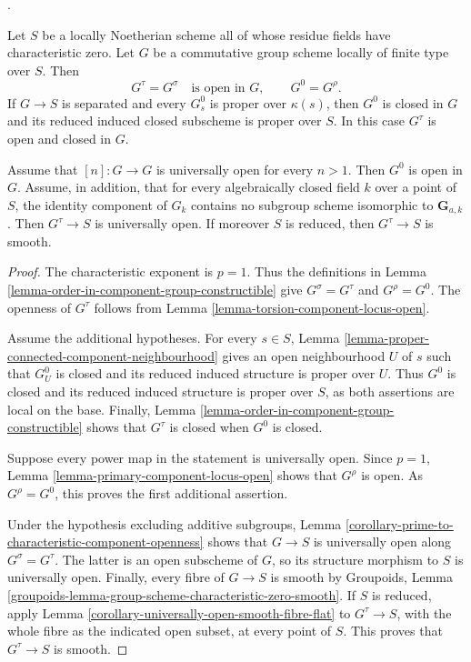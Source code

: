 \begin{lemma}
\label{lemma-characteristic-zero-component-loci}
\begin{reference}
\cite[Expos\'e 236, Corollary 1.10, p. 230]{FGA}.
\end{reference}
Let $S$ be a locally Noetherian scheme all of whose residue fields have
characteristic zero. Let $G$ be a commutative group scheme locally of finite
type over $S$. Then
$$
G^\tau = G^\sigma \quad\text{is open in }G,
\qquad
G^0 = G^\rho.
$$
If $G \to S$ is separated and every $G_s^0$ is proper over $\kappa(s)$,
then $G^0$ is closed in $G$ and its reduced induced closed subscheme is
proper over $S$. In this case $G^\tau$ is open and closed in $G$.

Assume that $[n] : G\to G$ is universally open for every $n>1$. Then $G^0$
is open in $G$. Assume, in addition, that for every algebraically closed
field $k$ over a point of $S$, the identity component of $G_k$ contains no
subgroup scheme isomorphic to $\mathbf G_{a,k}$. Then $G^\tau\to S$ is
universally open. If moreover $S$ is reduced, then $G^\tau\to S$ is smooth.
\end{lemma}

\begin{proof}
The characteristic exponent is $p=1$. Thus the definitions in
Lemma \ref{lemma-order-in-component-group-constructible} give
$G^\sigma=G^\tau$ and $G^\rho=G^0$. The openness of $G^\tau$ follows from
Lemma \ref{lemma-torsion-component-locus-open}.

Assume the additional hypotheses. For every $s \in S$, Lemma
\ref{lemma-proper-connected-component-neighbourhood} gives an open
neighbourhood $U$ of $s$ such that $G_U^0$ is closed and its reduced induced
structure is proper over $U$. Thus $G^0$ is closed and its reduced induced
structure is proper over $S$, as both assertions are local on the base.
Finally, Lemma \ref{lemma-order-in-component-group-constructible} shows that
$G^\tau$ is closed when $G^0$ is closed.

Suppose every power map in the statement is universally open. Since $p=1$,
Lemma \ref{lemma-primary-component-locus-open} shows that $G^\rho$ is open.
As $G^\rho=G^0$, this proves the first additional assertion.

Under the hypothesis excluding additive subgroups,
Lemma \ref{corollary-prime-to-characteristic-component-openness} shows that
$G\to S$ is universally open along $G^\sigma=G^\tau$. The latter is an open
subscheme of $G$, so its structure morphism to $S$ is universally open.
Finally, every fibre of $G\to S$ is smooth by Groupoids, Lemma
\ref{groupoids-lemma-group-scheme-characteristic-zero-smooth}. If $S$ is
reduced, apply
Lemma \ref{corollary-universally-open-smooth-fibre-flat} to $G^\tau\to S$,
with the whole fibre as the indicated open subset, at every point of $S$.
This proves that $G^\tau\to S$ is smooth.
\end{proof}









